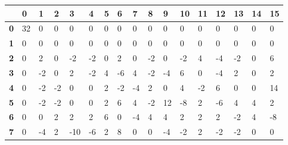 \begin{longtable}[c]{|l|l|l|l|l|l|l|l|l|l|l|l|l|l|l|l|l|}
\hline
            & \textbf{0} & \textbf{1} & \textbf{2} & \textbf{3} & \textbf{4} & \textbf{5} & \textbf{6} & \textbf{7} & \textbf{8} & \textbf{9} & \textbf{10} & \textbf{11} & \textbf{12} & \textbf{13} & \textbf{14} & \textbf{15} \\ \hline
\endfirsthead
%
\endhead
%
\textbf{0}  & 32         & 0          & 0          & 0          & 0          & 0          & 0          & 0          & 0          & 0          & 0           & 0           & 0           & 0           & 0           & 0           \\ \hline
\textbf{1}  & 0          & 0          & 0          & 0          & 0          & 0          & 0          & 0          & 0          & 0          & 0           & 0           & 0           & 0           & 0           & 0           \\ \hline
\textbf{2}  & 0          & 2          & 0          & -2         & -2         & 0          & 2          & 0          & -2         & 0          & -2          & 4           & -4          & -2          & 0           & 6           \\ \hline
\textbf{3}  & 0          & -2         & 0          & 2          & -2         & 4          & -6         & 4          & -2         & -4         & 6           & 0           & -4          & 2           & 0           & 2           \\ \hline
\textbf{4}  & 0          & -2         & -2         & 0          & 0          & 2          & -2         & -4         & 2          & 0          & 4           & -2          & 6           & 0           & 0           & 14          \\ \hline
\textbf{5}  & 0          & -2         & -2         & 0          & 0          & 2          & 6          & 4          & -2         & 12         & -8          & 2           & -6          & 4           & 4           & 2           \\ \hline
\textbf{6}  & 0          & 0          & 2          & 2          & 2          & 6          & 0          & -4         & 4          & 4          & 2           & 2           & 2           & -2          & 4           & -8          \\ \hline
\textbf{7}  & 0          & -4         & 2          & -10        & -6         & 2          & 8          & 0          & 0          & -4         & -2          & 2           & -2          & -2          & 0           & 0           \\ \hline

\end{longtable}
